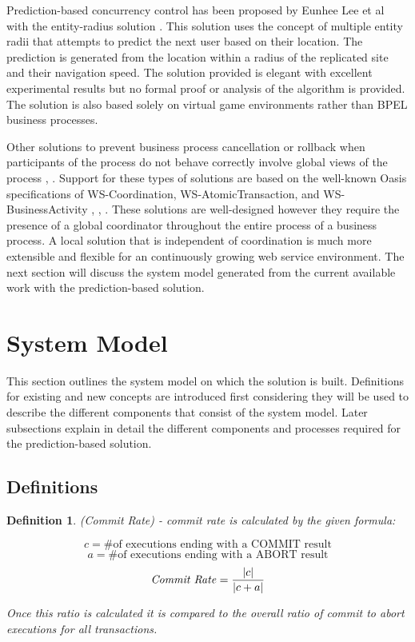 \documentclass[conference]{IEEEtran}
\newtheorem{definition}{Definition}
\DeclarePairedDelimiter\abs{\lvert}{\rvert}%
\begin{document}
Prediction-based concurrency control has been proposed by Eunhee Lee et al with the entity-radius solution \cite{Eunhee_PredictionBasedCC}. This solution uses the concept of multiple entity radii that attempts to predict the next user based on their location. The prediction is generated from the location within a radius of the replicated site and their navigation speed. The solution provided is elegant with excellent experimental results but no formal proof or analysis of the algorithm is provided. The solution is also based solely on virtual game environments rather than BPEL business processes. 

Other solutions to prevent business process cancellation or rollback when participants of the process do not behave correctly involve global views of the process \cite{Riegen_RuleBased}, \cite{Fekete_RAMP}. Support for these types of solutions are based on the well-known Oasis specifications of WS-Coordination, WS-AtomicTransaction, and WS-BusinessActivity \cite{WSCO}, \cite{WSAT}, \cite{WSBA}. These solutions are well-designed however they require the presence of a global coordinator throughout the entire process of a business process. A local solution that is independent of coordination is much more extensible and flexible for an continuously growing web service environment. The next section will discuss the system model generated from the current available work with the prediction-based solution.


\section{System Model}
This section outlines the system model on which the solution is built. Definitions for existing and new concepts are introduced first considering they will be used to describe the different components that consist of the system model. Later subsections explain in detail the different components and processes required for the prediction-based solution.

\subsection{Definitions}
\label{definitions}

\begin{definition}
\label{cmt_rate}
 (Commit Rate) - commit rate is calculated by the given formula:
 
 \[\textrm{$c$} = \textrm{\# of executions ending with a COMMIT result}\]
 \[\textrm{$a$} = \textrm{\# of executions ending with a ABORT result}\]
 \[\textrm{\textit{Commit Rate}} =\frac{\abs{c}}{\abs{c + a}}\]
 
 Once this ratio is calculated it is compared to the overall ratio of commit to abort executions for all transactions.
 
\end{definition}
\end{document}
